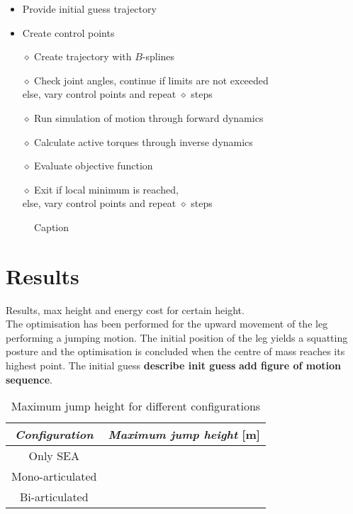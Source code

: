 \documentclass[letterpaper, 10 pt, conference]{ieeeconf}  %
\begin{document}
\begin{itemize}
	\item Provide initial guess trajectory
	\item Create control points\\
	\item[$\diamond$] Create trajectory with $B$-splines
	\item[$\diamond$] Check joint angles, continue if limits are not exceeded \\else, vary control points and repeat $\diamond$ steps
	\item[$\diamond$] Run simulation of motion through forward dynamics
	\item[$\diamond$] Calculate active torques through inverse dynamics
	\item[$\diamond$] Evaluate objective function\\
	\item[$\diamond$] Exit if local minimum is reached, \\ else, vary control points and repeat $\diamond$ steps
\end{itemize}

	





   \begin{figure}[thpb]
      \centering
      \caption{Caption}
      \label{figurelabel}
   \end{figure}
   
\section{Results} \label{sec:results}

Results, max height and energy cost for certain height.\\

The optimisation has been performed for the upward movement of the leg performing a jumping motion. The initial position of the leg yields a squatting posture and the optimisation is concluded when the centre of mass reaches its highest point. The initial guess \textbf{describe init guess}  \textbf{add figure of motion sequence}.  

\begin{table}[h]
	\caption{Maximum jump height for different configurations}
	\label{maxheight}
	\begin{center}
		\begin{tabular}{c||c}
		\textit{Configuration}	& \textit{Maximum jump height} [m] \\
			\hline
			Only SEA &   \\
			\hline
			Mono-articulated &  \\
			\hline
			Bi-articulated & 
		\end{tabular}
	\end{center}
\end{table}
\end{document}
